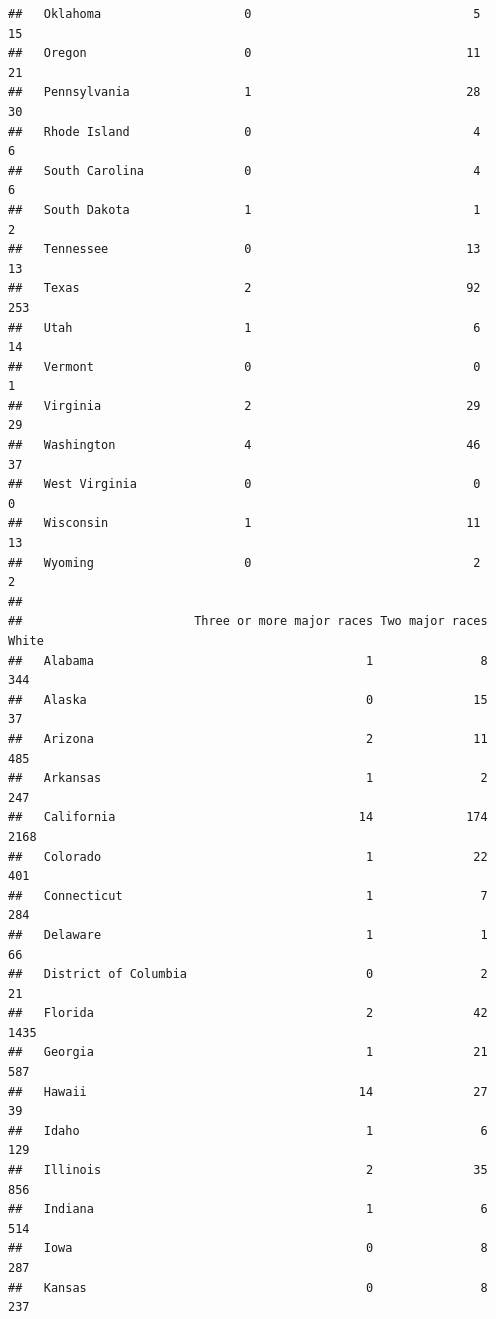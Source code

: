 \documentclass[
]{book}
\theoremstyle{definition}
\theoremstyle{definition}
\theoremstyle{definition}
\theoremstyle{remark}
\begin{document}
\begin{verbatim}
##   Oklahoma                    0                               5              15
##   Oregon                      0                              11              21
##   Pennsylvania                1                              28              30
##   Rhode Island                0                               4               6
##   South Carolina              0                               4               6
##   South Dakota                1                               1               2
##   Tennessee                   0                              13              13
##   Texas                       2                              92             253
##   Utah                        1                               6              14
##   Vermont                     0                               0               1
##   Virginia                    2                              29              29
##   Washington                  4                              46              37
##   West Virginia               0                               0               0
##   Wisconsin                   1                              11              13
##   Wyoming                     0                               2               2
##                       
##                        Three or more major races Two major races White
##   Alabama                                      1               8   344
##   Alaska                                       0              15    37
##   Arizona                                      2              11   485
##   Arkansas                                     1               2   247
##   California                                  14             174  2168
##   Colorado                                     1              22   401
##   Connecticut                                  1               7   284
##   Delaware                                     1               1    66
##   District of Columbia                         0               2    21
##   Florida                                      2              42  1435
##   Georgia                                      1              21   587
##   Hawaii                                      14              27    39
##   Idaho                                        1               6   129
##   Illinois                                     2              35   856
##   Indiana                                      1               6   514
##   Iowa                                         0               8   287
##   Kansas                                       0               8   237

\end{verbatim}
\end{document}
